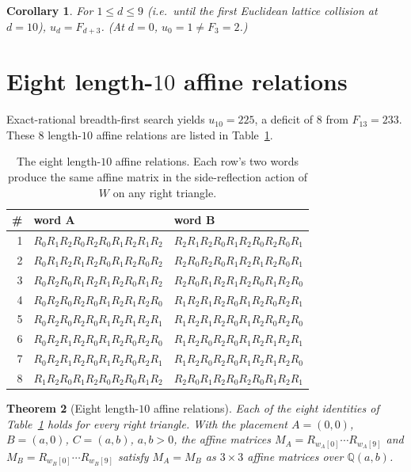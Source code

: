 \documentclass[11pt,a4paper]{article}
\newtheorem{theorem}{Theorem}
\newtheorem{corollary}[theorem]{Corollary}
\theoremstyle{remark}
\theoremstyle{plain}
\begin{document}
\begin{corollary}
For $1 \le d \le 9$ (i.e.\ until the first Euclidean lattice collision at
$d = 10$), $u_d = F_{d+3}$.  (At $d = 0$, $u_0 = 1 \ne F_3 = 2$.)
\end{corollary}

\section{Eight length-$10$ affine relations}
\label{sec:bonfioli}

Exact-rational breadth-first search yields $u_{10} = 225$, a deficit of
$8$ from $F_{13} = 233$.  These $8$ length-$10$ affine relations are
listed in Table~\ref{tab:bonfioli}.

\begin{table}[ht!]
\centering
\small
\renewcommand{\arraystretch}{1.2}
\begin{tabular}{r l l}
\toprule
\# & word A & word B \\
\midrule
1 & $R_0 R_1 R_2 R_0 R_2 R_0 R_1 R_2 R_1 R_2$ &
    $R_2 R_1 R_2 R_0 R_1 R_2 R_0 R_2 R_0 R_1$ \\
2 & $R_0 R_1 R_2 R_1 R_2 R_0 R_1 R_2 R_0 R_2$ &
    $R_2 R_0 R_2 R_0 R_1 R_2 R_1 R_2 R_0 R_1$ \\
3 & $R_0 R_2 R_0 R_1 R_2 R_1 R_2 R_0 R_1 R_2$ &
    $R_2 R_0 R_1 R_2 R_1 R_2 R_0 R_1 R_2 R_0$ \\
4 & $R_0 R_2 R_0 R_2 R_0 R_1 R_2 R_1 R_2 R_0$ &
    $R_1 R_2 R_1 R_2 R_0 R_1 R_2 R_0 R_2 R_1$ \\
5 & $R_0 R_2 R_0 R_2 R_0 R_1 R_2 R_1 R_2 R_1$ &
    $R_1 R_2 R_1 R_2 R_0 R_1 R_2 R_0 R_2 R_0$ \\
6 & $R_0 R_2 R_1 R_2 R_0 R_1 R_2 R_0 R_2 R_0$ &
    $R_1 R_2 R_0 R_2 R_0 R_1 R_2 R_1 R_2 R_1$ \\
7 & $R_0 R_2 R_1 R_2 R_0 R_1 R_2 R_0 R_2 R_1$ &
    $R_1 R_2 R_0 R_2 R_0 R_1 R_2 R_1 R_2 R_0$ \\
8 & $R_1 R_2 R_0 R_1 R_2 R_0 R_2 R_0 R_1 R_2$ &
    $R_2 R_0 R_1 R_2 R_0 R_2 R_0 R_1 R_2 R_1$ \\
\bottomrule
\end{tabular}
\caption{The eight length-$10$ affine relations.  Each row's two words
produce the same affine matrix in the side-reflection action of $W$ on
any right triangle.}
\label{tab:bonfioli}
\end{table}

\begin{theorem}[Eight length-$10$ affine relations]
\label{thm:symbolic}
Each of the eight identities of Table~\ref{tab:bonfioli} holds for
every right triangle.  With the placement $A = (0, 0)$, $B = (a, 0)$,
$C = (a, b)$, $a, b > 0$, the affine matrices $M_A = R_{w_A[0]} \cdots R_{w_A[9]}$
and $M_B = R_{w_B[0]} \cdots R_{w_B[9]}$ satisfy $M_A = M_B$ as
$3 \times 3$ affine matrices over $\mathbb{Q}(a, b)$.
\end{theorem}
\end{document}
